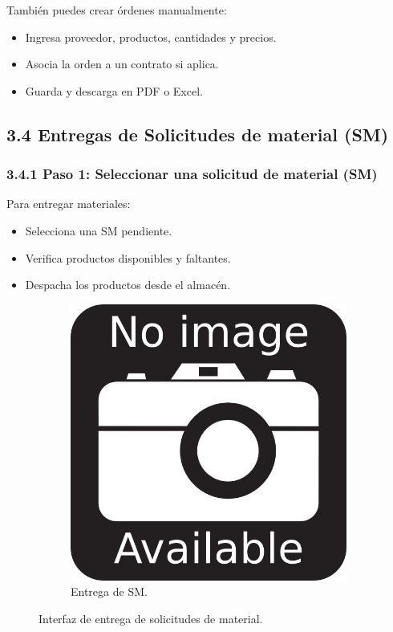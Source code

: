 También puedes crear órdenes manualmente:

\begin{itemize}
    \item Ingresa proveedor, productos, cantidades y precios.
    \item Asocia la orden a un contrato si aplica.
    \item Guarda y descarga en PDF o Excel.
\end{itemize}

\subsection{3.4 Entregas de Solicitudes de material (SM)}

\subsubsection{3.4.1 Paso 1: Seleccionar una solicitud de material (SM)}

Para entregar materiales:

\begin{itemize}
    \item Selecciona una SM pendiente.
    \item Verifica productos disponibles y faltantes.
    \item Despacha los productos desde el almacén.
\end{itemize}

\begin{figure}[h]
\centering
\begin{subfigure}{0.4\textwidth}
    \includegraphics[width=\textwidth]{imgs/no-image.png}
    \caption{Entrega de SM.}
    \label{fig:admin5}
\end{subfigure}
\caption{Interfaz de entrega de solicitudes de material.}
\end{figure}
